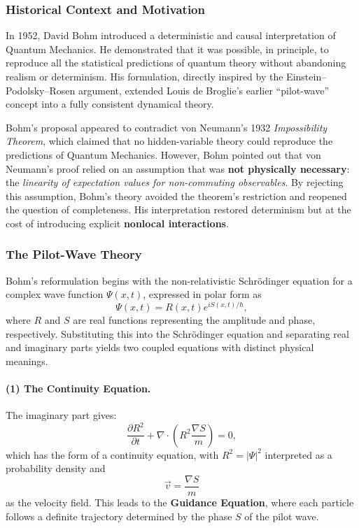 \subsubsection{Historical Context and Motivation}

In 1952, David Bohm introduced a deterministic and causal interpretation of Quantum Mechanics.  
He demonstrated that it was possible, in principle, to reproduce all the statistical predictions of quantum theory without abandoning realism or determinism.  
His formulation, directly inspired by the Einstein–Podolsky–Rosen argument, extended Louis de Broglie’s earlier ``pilot-wave'' concept into a fully consistent dynamical theory.

Bohm’s proposal appeared to contradict von Neumann’s 1932 \textit{Impossibility Theorem}, which claimed that no hidden-variable theory could reproduce the predictions of Quantum Mechanics.  
However, Bohm pointed out that von Neumann’s proof relied on an assumption that was \textbf{not physically necessary}: the \textit{linearity of expectation values for non-commuting observables}.  
By rejecting this assumption, Bohm’s theory avoided the theorem’s restriction and reopened the question of completeness.  
His interpretation restored determinism but at the cost of introducing explicit \textbf{nonlocal interactions}.

\subsubsection{The Pilot-Wave Theory}

Bohm’s reformulation begins with the non-relativistic Schrödinger equation for a complex wave function $\Psi(x,t)$, expressed in polar form as
\[
\Psi(x,t) = R(x,t)e^{iS(x,t)/\hbar},
\]
where $R$ and $S$ are real functions representing the amplitude and phase, respectively.  
Substituting this into the Schrödinger equation and separating real and imaginary parts yields two coupled equations with distinct physical meanings.

\paragraph{(1) The Continuity Equation.}
The imaginary part gives:
\begin{equation}
\frac{\partial R^2}{\partial t} + \nabla \cdot \left( R^2 \frac{\nabla S}{m} \right) = 0,
\end{equation}
which has the form of a continuity equation, with $R^2 = |\Psi|^2$ interpreted as a probability density and
\[
\vec{v} = \frac{\nabla S}{m}
\]
as the velocity field.  
This leads to the \textbf{Guidance Equation}, where each particle follows a definite trajectory determined by the phase $S$ of the pilot wave.

